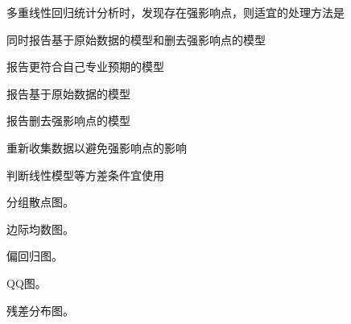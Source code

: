 \par\addvspace{6pt}\noindent\begin{minipage}{\linewidth}


多重线性回归统计分析时，发现存在强影响点，则适宜的处理方法是


\begin{choices}

\item 同时报告基于原始数据的模型和删去强影响点的模型

\item 报告更符合自己专业预期的模型

\item 报告基于原始数据的模型

\item 报告删去强影响点的模型

\item 重新收集数据以避免强影响点的影响

\end{choices}

\end{minipage}\par\vspace{4pt}

\par\addvspace{6pt}\noindent\begin{minipage}{\linewidth}


判断线性模型等方差条件宜使用


\begin{choices}

\item 分组散点图。

\item 边际均数图。

\item 偏回归图。

\item QQ图。

\item 残差分布图。

\end{choices}

\end{minipage}\par\vspace{4pt}

